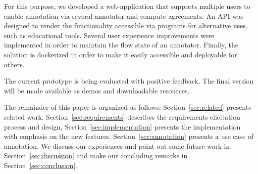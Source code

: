 For this purpose, we developed a web-application that supports multiple users to enable annotation via several annotator and compute agreements. 
An API was designed to render the functionality accessible via programs for alternative uses, such as educational tools. 
Several user experience improvements were implemented in order to maintain the flow state of an annotator.
Finally, the solution is dockerized in order to make it easily accessible and deployable for others. 

The current prototype is being evaluated with positive feedback. 
The final version will be made available as demos and downloadable resources. 

The remainder of this paper is organized as follows: 
Section~\ref{sec:related} presents related work, 
Section~\ref{sec:requirements} describes the requirements elicitation process and design, 
Section~\ref{sec:implementation} presents the implementation with emphasis on the new features, 
Section~\ref{sec:annotation} presents a use case of annotation.
We discuss our experiences and point out some future work in Section~\ref{sec:discussion} and make our concluding remarks in Section~\ref{sec:conclusion}.
